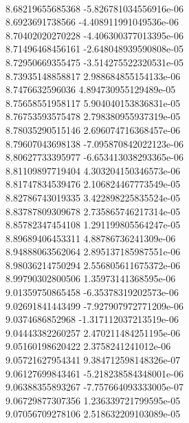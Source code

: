 { \\
8.68219655685368 -5.826781034556916e-06
 \\
8.6923691738566 -4.408911991049536e-06
 \\
8.70402020270228 -4.406300377013395e-06
 \\
8.71496468456161 -2.648048939590808e-05
 \\
8.72950669355475 -3.514275522320531e-05
 \\
8.73935148858817 2.988684855154133e-06
 \\
8.7476632596036 4.894730955129489e-05
 \\
8.75658551958117 5.904040153836831e-05
 \\
8.76753593575478 2.798380955937319e-05
 \\
8.78035290515146 2.696074716368457e-06
 \\
8.79607043698138 -7.095870842022123e-06
 \\
8.80627733395977 -6.653413038293365e-06
 \\
8.81109897719404 4.303204150346573e-06
 \\
8.81747834539476 2.106824467773549e-05
 \\
8.82786743019335 3.422898225835524e-05
 \\
8.83787809309678 2.735865746217314e-05
 \\
8.85782347454108 1.291199805564247e-05
 \\
8.89689406453311 4.88786736241309e-06
 \\
8.94888063562064 2.895137185987551e-06
 \\
8.98036214750294 2.556805611675372e-06
 \\
8.99790302800506 1.35973141368595e-06
 \\
9.01359750865458 -6.35378319202573e-06
 \\
9.02691841443499 -7.927907972771209e-06
 \\
9.0374686852968 -1.317112037213519e-06
 \\
9.04443382260257 2.470211484251195e-06
 \\
9.05160198620422 2.3758241241012e-06
 \\
9.05721627954341 9.384712598148326e-07
 \\
9.06127699843461 -5.218238584348001e-06
 \\
9.06388355893267 -7.757664093333005e-07
 \\
9.06729877307356 1.236339721799595e-05
 \\
9.07056709278106 2.518632209103089e-05
 \\
}
